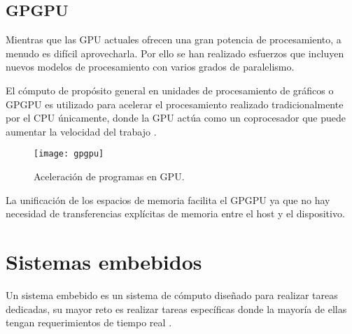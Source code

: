 
    \subsection{GPGPU}
    
    Mientras que las GPU actuales ofrecen una gran potencia de procesamiento, a menudo es difícil aprovecharla. Por ello se han realizado esfuerzos que incluyen nuevos modelos de procesamiento con varios grados de paralelismo.
    \newline
   
    El cómputo  de propósito general en unidades de procesamiento de gráficos o GPGPU es utilizado para acelerar el procesamiento realizado tradicionalmente por el CPU únicamente, donde la GPU actúa como un coprocesador que puede aumentar la velocidad del trabajo \cite{GpuCpu}.
    
     \begin{figure}[ht]
      \centering
        \texttt{[image: gpgpu]}
        \caption{Aceleración de programas en GPU\cite{gpgpu}.}
        \label{fig:gpgpu}
    \end{figure}
                
   \vspace{0.3cm}
   
    La unificación de los espacios de memoria facilita el GPGPU ya que no hay necesidad de transferencias explícitas de memoria entre el host y el dispositivo.
    
    \section{Sistemas embebidos}

    Un sistema embebido es un sistema de cómputo diseñado para realizar tareas dedicadas, su mayor reto es realizar tareas específicas donde la mayoría de ellas tengan requerimientos de tiempo real \cite{LimPree}.

